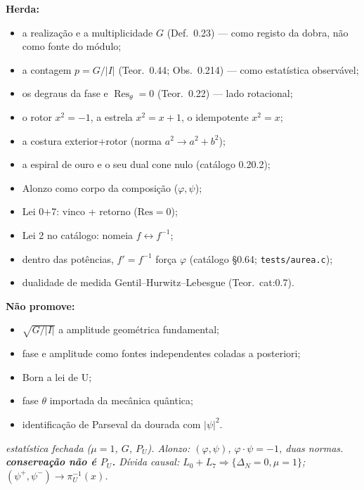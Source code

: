 \documentclass[11pt,a4paper]{article}
\begin{document}
\textbf{Herda:}
\begin{itemize}[leftmargin=1.2em,itemsep=1pt]
  \item a realização e a multiplicidade $G$ (Def.~0.23) --- como registo da dobra, não como fonte do módulo;
  \item a contagem $p=G/|I|$ (Teor.~0.44; Obs.~0.214) --- como estatística observável;
  \item os degraus da fase e $\operatorname{Res}_\theta=0$ (Teor.~0.22) --- lado rotacional;
  \item o rotor $x^2=-1$, a estrela $x^2=x+1$, o idempotente $x^2=x$;
  \item a costura exterior+rotor (norma $a^2\to a^2+b^2$);
  \item a espiral de ouro e o seu dual cone nulo (catálogo 0.20.2);
  \item Alonzo como corpo da composição ($\varphi,\psi$);
  \item Lei 0+7: vinco + retorno ($\mathrm{Res}=0$);
  \item Lei 2 no catálogo: nomeia $f\leftrightarrow f^{-1}$;
  \item dentro das potências, $f'=f^{-1}$ força $\varphi$
        (catálogo §0.64; \texttt{tests/aurea.c});
  \item dualidade de medida Gentil--Hurwitz--Lebesgue (Teor.~cat:0.7).
\end{itemize}

\textbf{Não promove:}
\begin{itemize}[leftmargin=1.2em,itemsep=1pt]
  \item $\sqrt{G/|I|}$ a amplitude geométrica fundamental;
  \item fase e amplitude como fontes independentes coladas a posteriori;
  \item Born a lei de U;
  \item fase $\theta$ importada da mecânica quântica;
  \item identificação de Parseval da dourada com $|\psi|^2$.
\end{itemize}

\vspace{0.8em}
\begin{center}
\textit{estatística fechada ($\mu=1$, $G$, $P_U$). Alonzo: $(\varphi,\psi)$, $\varphi\cdot\psi=-1$, duas normas.\newline
\textbf{conservação não é $P_U$.} Dívida causal: $L_0+L_7\Rightarrow\{\Delta_N=0,\mu=1\}$;
$(\psi^+,\psi^-)\to\pi_U^{-1}(x)$.}
\end{center}
\end{document}
